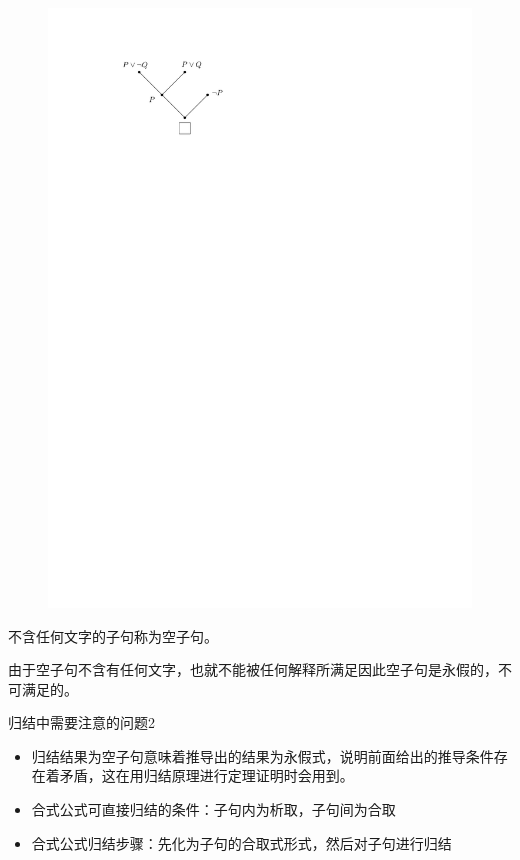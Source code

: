 \begin{example}
\begin{enumerate}
\begin{figure}[!h]
            \includegraphics{image/归结-3.pdf}
        \end{figure}
    \end{enumerate}
\end{example}
\begin{definition}[空子句]
    不含任何文字的子句称为空子句。
    
    由于空子句不含有任何文字，也就不能被任何解释所满足因此空子句是永假的，不可满足的。
\end{definition}
\begin{note}
    归结中需要注意的问题2
    \begin{itemize}
        \item \textcolor{main1}{归结结果为空子句}意味着推导出的结果为\textcolor{main1}{永假式}，说明前面给出的推导条件存在着矛盾，这在用归结原理进行定理证明时会用到。
        \item 合式公式可直接归结的条件：子句内为析取，子句间为合取
        \item 合式公式归结步骤：先化为子句的合取式形式，然后对子句进行归结
    \end{itemize}
\end{note}

